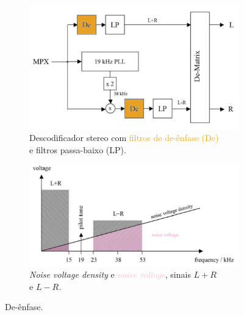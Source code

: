 \begin{figure}[ht] 
    \begin{subfigure}[b]{0.5\linewidth}
        \centering
        \includegraphics[width=0.90\linewidth]{img/peculiaridades/decoder_stereo.png}
        \caption{Descodificador stereo com \textcolor{orange}{filtros de de-ênfase (De)} \\ e filtros passa-baixo (LP).} 
        \label{fig:aa} 
    \end{subfigure}%
    \begin{subfigure}[b]{0.5\linewidth}
        \centering
        \includegraphics[width=0.90\linewidth]{img/peculiaridades/noise.png} 
        \caption{\textit{Noise voltage density} e \textit{\textcolor{pink}{noise voltage}}, sinais $L+R$ \\ e $L-R$.} 
        \label{fig:bb} 
    \end{subfigure} 
    \caption{De-ênfase.}
    \label{fig:multiplas2}
\end{figure}

